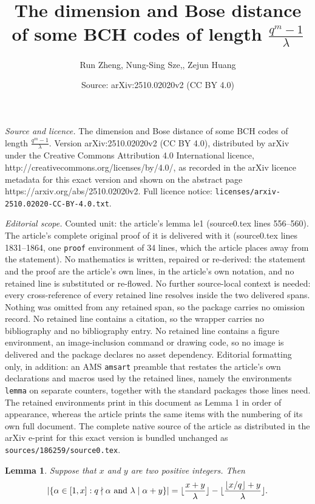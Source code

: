 \documentclass[10pt,a4paper]{amsart}
\title{The dimension and Bose distance of some BCH codes of length $\frac{q^{m}-1}{\lambda}$}
\author{Run Zheng, Nung-Sing Sze,, Zejun Huang}
\date{Source: arXiv:2510.02020v2 (CC BY 4.0)}
\newtheorem{lemma}{Lemma}
\begin{document}
\maketitle

\noindent\emph{Source and licence.} The dimension and Bose distance of some BCH codes of length $\frac{q^{m}-1}{\lambda}$. Version arXiv:2510.02020v2 (CC BY 4.0), distributed by arXiv under the Creative Commons Attribution 4.0 International licence, http://creativecommons.org/licenses/by/4.0/, as recorded in the arXiv licence metadata for this exact version and shown on the abstract page https://arxiv.org/abs/2510.02020v2. Full licence notice: \texttt{licenses/arxiv-2510.02020-CC-BY-4.0.txt}.\par\smallskip

\noindent\textit{Editorial scope.} Counted unit: the article's lemma le1 (source0.tex lines 556--560). The article's complete original proof of it is delivered with it (source0.tex lines 1831--1864, one \texttt{proof} environment of 34 lines, which the article places away from the statement). No mathematics is written, repaired or re-derived: the statement and the proof are the article's own lines, in the article's own notation, and no retained line is substituted or re-flowed.  No further source-local context is needed: every cross-reference of every retained line resolves inside the two delivered spans.  Nothing was omitted from any retained span, so the package carries no omission record.  No retained line contains a citation, so the wrapper carries no bibliography and no bibliography entry.  No retained line contains a figure environment, an image-inclusion command or drawing code, so no image is delivered and the package declares no asset dependency.  Editorial formatting only, in addition: an AMS \texttt{amsart} preamble that restates the article's own declarations and macros used by the retained lines, namely the environments \texttt{lemma} on separate counters, together with the standard packages those lines need.  The retained environments print in this document as Lemma 1 in order of appearance, whereas the article prints the same items with the numbering of its own full document.  The complete native source of the article as distributed in the arXiv e-print for this exact version is bundled unchanged as \texttt{sources/186259/source0.tex}.
\begin{lemma}\label{le1}Suppose that  $x$ and $y$ are two positive integers. Then  
   \begin{equation}\notag
       \left|\{\alpha\in [1,x]: q\nmid \alpha \hbox{ and }\lambda\mid \alpha+y \}\right|=\lfloor \frac{x+y}{\lambda}\rfloor -\lfloor\frac{\lfloor {x}/{q}\rfloor+y}{\lambda} \rfloor.
    \end{equation}
\end{lemma}
\end{document}
